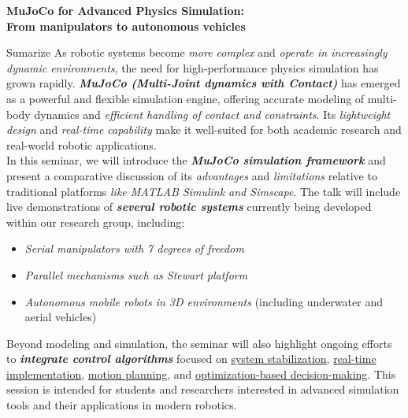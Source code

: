 \documentclass[11pt,a4paper]{article}
\begin{document}
	\pagestyle{empty}
	
	\fontsize{20pt}{30pt}\selectfont
	\begin{center}
		\textbf{MuJoCo for Advanced Physics Simulation: \\From manipulators to autonomous vehicles}
	\end{center}
	
	\fontsize{12pt}{18pt}\selectfont
	
	\begin{gradientbox}{Sumarize}
		As robotic systems become \textit{more complex} and \textit{operate in increasingly dynamic environments}, the need for high-performance physics simulation has grown rapidly. \textbf{\textit{MuJoCo (Multi-Joint dynamics with Contact)}} has emerged as a powerful and flexible simulation engine, offering accurate modeling of multi-body dynamics and \textit{efficient handling of contact and constraints}. Its \textit{lightweight design} and \textit{real-time capability} make it well-suited for both academic research and real-world robotic applications.\\
		
		In this seminar, we will introduce the \textbf{\textit{MuJoCo simulation framework}} and present a comparative discussion of its \textit{advantages} and \textit{limitations} relative to traditional platforms \textit{like MATLAB Simulink and Simscape}. The talk will include live demonstrations of \textbf{\textit{several robotic systems}} currently being developed within our research group, including:
		\begin{itemize}[itemsep=-5pt, topsep=0pt]
			\item {\textit{Serial manipulators with 7 degrees of freedom}}
			\item {\textit{Parallel mechanisms such as Stewart platform}}
			\item {\textit{Autonomous mobile robots in 3D environments}} (including underwater and aerial vehicles)
		\end{itemize}
		\vspace{0.3cm}
		Beyond modeling and simulation, the seminar will also highlight ongoing efforts to \textbf{\textit{integrate control algorithms}} focused on \underline{system stabilization}, \underline{real-time implementation}, \underline{motion planning}, and \underline{optimization-based decision-making}. This session is intended for students and researchers interested in advanced simulation tools and their applications in modern robotics.
	\end{gradientbox}
	
\end{document}
